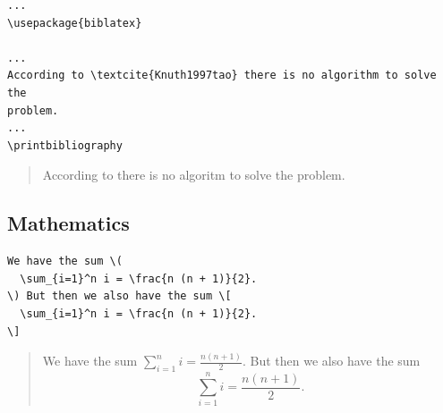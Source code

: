 \begin{frame}[fragile]
  \begin{example}[Input]
    \begin{lstlisting}
...
\usepackage{biblatex}

...
According to \textcite{Knuth1997tao} there is no algorithm to solve the 
problem.
...
\printbibliography
    \end{lstlisting}
  \end{example}

  \pause

  \begin{example}[Output]
    \begin{quote}
      According to \textcite{Knuth1997tao} there is no algoritm to solve the 
      problem.
    \end{quote}
  \end{example}
\end{frame}

\begin{frame}
  \begin{example}
    
  \end{example}
\end{frame}


\subsection{Mathematics}

\begin{frame}[fragile]
  \begin{example}[Input]
    \begin{lstlisting}
We have the sum \(
  \sum_{i=1}^n i = \frac{n (n + 1)}{2}.
\) But then we also have the sum \[
  \sum_{i=1}^n i = \frac{n (n + 1)}{2}.
\]
    \end{lstlisting}
  \end{example}

  \pause

  \begin{example}[Output]
    \begin{quote}
We have the sum \(
  \sum_{i=1}^n i = \frac{n (n + 1)}{2}.
\) But then we also have the sum \[
  \sum_{i=1}^n i = \frac{n (n + 1)}{2}.
\]
    \end{quote}
  \end{example}
\end{frame}

